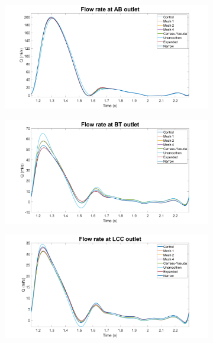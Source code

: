 \begin{figure}
     \centering
     \begin{subfigure}[b]{0.49\textwidth}
         \centering
         \includegraphics[width=\textwidth]{Figures/QAB.png}
     \end{subfigure}
     \hfill
     \begin{subfigure}[b]{0.49\textwidth}
         \centering
         \includegraphics[width=\textwidth]{Figures/QBT.png}
     \end{subfigure}
     \hfill
     \begin{subfigure}[b]{0.49\textwidth}
         \centering
         \includegraphics[width=\textwidth]{Figures/QLCC.png}

\end{subfigure}
\end{figure}
